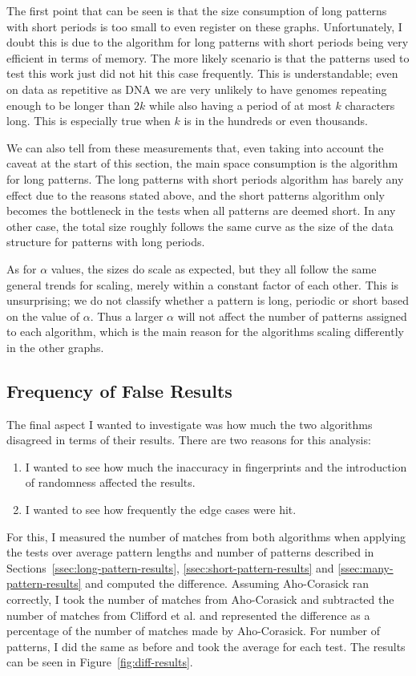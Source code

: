 \documentclass[ %
                    author={Dominic Joseph Moylett},
                    degree={MEng},
                     title={Dictionary Matching with Fingerprints},
                  subtitle={An Empirical Analysis},
                      type={research},
                      year={2015} ]{dissertation}
\begin{document}
The first point that can be seen is that the size consumption of long patterns with short periods is too small to even register on these graphs. Unfortunately, I doubt this is due to the algorithm for long patterns with short periods being very efficient in terms of memory. The more likely scenario is that the patterns used to test this work just did not hit this case frequently. This is understandable; even on data as repetitive as DNA we are very unlikely to have genomes repeating enough to be longer than $2k$ while also having a period of at most $k$ characters long. This is especially true when $k$ is in the hundreds or even thousands.

We can also tell from these measurements that, even taking into account the caveat at the start of this section, the main space consumption is the algorithm for long patterns. The long patterns with short periods algorithm has barely any effect due to the reasons stated above, and the short patterns algorithm only becomes the bottleneck in the tests when all patterns are deemed short. In any other case, the total size roughly follows the same curve as the size of the data structure for patterns with long periods.

As for $\alpha$ values, the sizes do scale as expected, but they all follow the same general trends for scaling, merely within a constant factor of each other. This is unsurprising; we do not classify whether a pattern is long, periodic or short based on the value of $\alpha$. Thus a larger $\alpha$ will not affect the number of patterns assigned to each algorithm, which is the main reason for the algorithms scaling differently in the other graphs.

\subsection{Frequency of False Results}

The final aspect I wanted to investigate was how much the two algorithms disagreed in terms of their results. There are two reasons for this analysis:

\begin{enumerate}
  \item I wanted to see how much the inaccuracy in fingerprints and the introduction of randomness affected the results.
  \item I wanted to see how frequently the edge cases were hit.
\end{enumerate}

For this, I measured the number of matches from both algorithms when applying the tests over average pattern lengths and number of patterns described in Sections~\ref{ssec:long-pattern-results}, \ref{ssec:short-pattern-results} and \ref{ssec:many-pattern-results} and computed the difference. Assuming Aho-Corasick ran correctly, I took the number of matches from Aho-Corasick and subtracted the number of matches from Clifford et al. and represented the difference as a percentage of the number of matches made by Aho-Corasick. For number of patterns, I did the same as before and took the average for each test. The results can be seen in Figure~\ref{fig:diff-results}.
\end{document}
